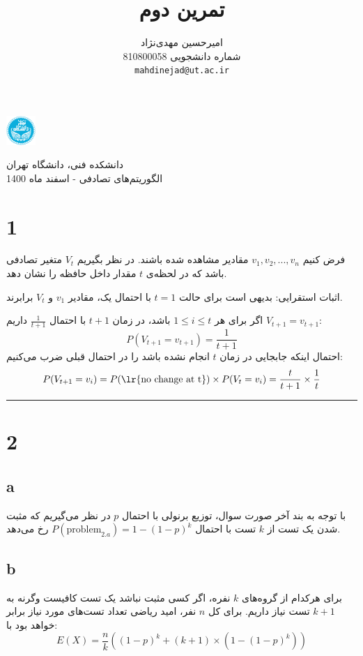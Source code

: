 \documentclass{article}
\title{
تمرین دوم
}
\author{%
  امیرحسین مهدی‌نژاد\\
  شماره دانشجویی 810800058\\
  \texttt{mahdinejad@ut.ac.ir} \\
}
\begin{document}
\begin{minipage}{0.1\textwidth}%
\includegraphics[width=1.1cm]{Photos/UT_logo.png}
\end{minipage}%
\hfill%
\begin{minipage}{0.9\textwidth}\raggedleft
دانشکده فنی، دانشگاه تهران\\
الگوریتم‌های تصادفی -  
اسفند
ماه 1400\\
\end{minipage}

\makepertitle

\section*{1}
فرض کنیم
$v_1, v_2, ..., v_n$
مقادیر مشاهده شده باشند. در نظر بگیریم
$V_t$
متغیر تصادفی باشد که در لحظه‌ی
$t$
مقدار داخل حافظه را نشان دهد.

اثبات استقرایی: بدیهی است برای حالت
$t = 1$
با احتمال یک، مقادیر
$v_1$
و
$V_t$
برابرند.

اگر برای هر
$1 \leq i \leq t$
باشد، در زمان
$t+1$
با احتمال
$\frac{1}{t+1}$
داریم
$V_{t+1} = v_{t+1}$:
$$ P(V_{t+1} = v_{t+1}) = \frac{1}{t+1} $$
احتمال اینکه جابجایی در زمان 
$t$
انجام نشده باشد را در احتمال قبلی ضرب می‌کنیم:
$$ P(V_{t+1} = v_i) = P(\text{\lr{no change at t}}) \times P(V_t = v_i) = \frac{t}{t+1} \times \frac{1}{t} $$
\rule{\linewidth}{1pt}

\section*{2}
\subsection*{a}
با توجه به بند آخر صورت سوال، توزیع برنولی با احتمال
$p$
در نظر می‌گیریم که مثبت شدن یک تست از
$k$
تست با احتمال
$ P(\text{problem}_{2.a}) = 1 - (1 - p)^k $
رخ می‌دهد.

\subsection*{b}
برای هرکدام از گروه‌های
$k$
نفره، اگر کسی مثبت نباشد یک تست کافیست وگرنه به
$k+1$
تست نیاز داریم. برای کل
$n$
نفر، امید ریاضی تعداد تست‌های مورد نیاز برابر خواهد بود با:
$$E(X) = \frac{n}{k}\left( (1-p)^k + (k+1) \times \left( 1 - (1 - p)^k \right) \right)$$
\end{document}

